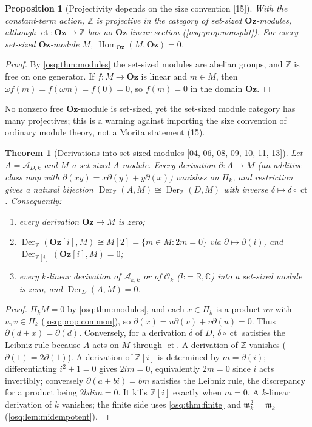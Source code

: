 \documentclass[11pt,letterpaper]{article}
\numberwithin{equation}{section}
\newtheorem{theorem}{Theorem}[section]
\newtheorem{proposition}[proposition]{Proposition}
\theoremstyle{definition}
\theoremstyle{remark}
\theoremstyle{plain}
\newcommand{\Oz}{\mathbf{Oz}}
\newcommand{\GOz}{\Oz[i]}
\newcommand{\Z}{\mathbb Z}
\newcommand{\R}{\mathbb R}
\newcommand{\C}{\mathbb C}
\newcommand{\A}{\mathcal A}          %
\newcommand{\mm}{\mathfrak m}        %
\newcommand{\OO}{\mathcal O}         %
\newcommand{\ct}{\operatorname{ct}}
\newcommand{\Hom}{\operatorname{Hom}}
\newcommand{\Der}{\operatorname{Der}}
\newcommand{\src}[1]{\textup{\textsf{[#1]}}}
\begin{document}
\begin{proposition}[Projectivity depends on the size convention \src{15}]\label{osq:rep:prop:projectivity}
With the constant-term action, $\Z$ is projective in the category of set-sized $\Oz$-modules, although
$\ct:\Oz\to\Z$ has no $\Oz$-linear section (\cref{osq:prop:nonsplit}). For every set-sized $\Oz$-module $M$,
$\Hom_{\Oz}(M,\Oz)=0$.
\end{proposition}
\begin{proof}
By \cref{osq:thm:modules} the set-sized modules are abelian groups, and $\Z$ is free on one generator. If
$f:M\to\Oz$ is linear and $m\in M$, then $\omega f(m)=f(\omega m)=f(0)=0$, so $f(m)=0$ in the domain $\Oz$.
\end{proof}

No nonzero free $\Oz$-module is set-sized, yet the set-sized module category has many projectives; this is a
warning against importing the size convention of ordinary module theory, not a Morita statement (15).

\begin{theorem}[Derivations into set-sized modules \src{04, 06, 08, 09, 10, 11, 13}]\label{osq:thm:derivations}
Let $A=\A_{D,k}$ and $M$ a set-sized $A$-module. Every derivation $\partial:A\to M$ (an
additive class map with $\partial(xy)=x\partial(y)+y\partial(x)$) vanishes on $\Pi_k$, and
restriction gives a natural bijection $\Der_\Z(A,M)\cong\Der_\Z(D,M)$ with inverse
$\delta\mapsto\delta\circ\ct$. Consequently:
\begin{enumerate}
\item every derivation $\Oz\to M$ is zero;
\item $\Der_\Z(\GOz,M)\cong M[2]=\{m\in M:2m=0\}$ via $\partial\mapsto\partial(i)$, and
$\Der_{\Z[i]}(\GOz,M)=0$;
\item every $k$-linear derivation of $\A_{k,k}$ or of $\OO_k$ ($k=\R,\C$) into a set-sized
module is zero, and $\Der_D(A,M)=0$.
\end{enumerate}
\end{theorem}
\begin{proof}
$\Pi_kM=0$ by \cref{osq:thm:modules}, and each $x\in\Pi_k$ is a product $uv$ with
$u,v\in\Pi_k$ (\cref{osq:prop:common}), so $\partial(x)=u\partial(v)+v\partial(u)=0$.
Thus $\partial(d+x)=\partial(d)$. Conversely, for a derivation $\delta$ of $D$,
$\delta\circ\ct$ satisfies the Leibniz rule because $A$ acts on $M$ through $\ct$. A
derivation of $\Z$ vanishes ($\partial(1)=2\partial(1)$). A derivation of $\Z[i]$ is
determined by $m=\partial(i)$; differentiating $i^2+1=0$ gives $2im=0$, equivalently $2m=0$
since $i$ acts invertibly; conversely $\partial(a+bi)=bm$ satisfies the Leibniz rule, the
discrepancy for a product being $2bdim=0$. It kills $\Z[i]$ exactly when $m=0$. A $k$-linear
derivation of $k$ vanishes; the finite side uses \cref{osq:thm:finite} and
$\mm_k^2=\mm_k$ (\cref{osq:lem:midempotent}).
\end{proof}
\end{document}
